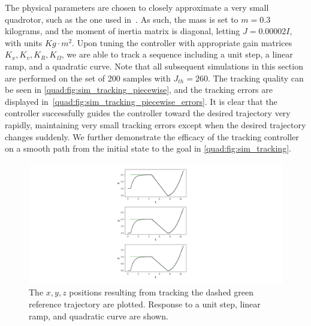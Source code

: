 The physical parameters are chosen to closely approximate a very small quadrotor, such as the one used in~\cite{Luis2016}. As such, the mass is set to $m=0.3$ kilograms, and the moment of inertia matrix is diagonal, letting $J=0.00002 I$, with units $Kg\cdot m^2$. Upon tuning the controller with appropriate gain matrices $K_x, K_v, K_R, K_\Omega$, we are able to track a sequence including a unit step, a linear ramp, and a quadratic curve. Note that all subsequent simulations in this section are performed on the set of 200 samples with $J_{th} = 260$. The tracking quality can be seen in \autoref{quad:fig:sim_tracking_piecewise}, and the tracking errors are displayed in~\autoref{quad:fig:sim_tracking_piecewise_errors}. It is clear that the controller successfully guides the controller toward the desired trajectory very rapidly, maintaining very small tracking errors except when the desired trajectory changes suddenly. We further demonstrate the efficacy of the tracking controller on a smooth path from the initial state to the goal in \autoref{quad:fig:sim_tracking}. 

\begin{figure}
    \hspace*{-8.8cm}
    \centering
    \includegraphics[scale=0.68]{./figures/sim_tracking_piecewise}
    \caption[Quadrotor step-response]{The $x,y,z$ positions resulting from tracking the dashed green reference trajectory are plotted. Response to a unit step, linear ramp, and quadratic curve are shown.}
    \label{quad:fig:sim_tracking_piecewise}
\end{figure}

